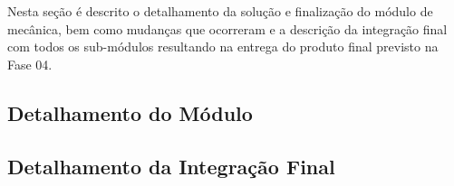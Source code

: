 \label{desenvolvimento_estrutura}

Nesta seção é descrito o detalhamento da solução e finalização do módulo de mecânica, bem como mudanças que ocorreram e a descrição da integração final com todos os sub-módulos resultando na entrega do produto final previsto na Fase 04.

\subsection{Detalhamento do Módulo}


\subsection{Detalhamento da Integração Final}






